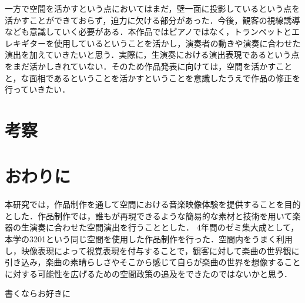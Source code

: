 一方で空間を活かすという点においてはまだ，壁一面に投影しているという点を活かすことができておらず，迫力に欠ける部分があった．今後，観客の視線誘導なども意識していく必要がある．本作品ではピアノではなく，トランペットとエレキギターを使用しているということを活かし，演奏者の動きや演奏に合わせた演出を加えていきたいと思う．実際に，生演奏における演出表現であるという点をまだ活かしきれていない．そのため作品発表に向けては，空間を活かすことと，な面相であるということを活かすということを意識したうえで作品の修正を行っていきたい．


\section{考察}


\section{おわりに}
本研究では，作品制作を通して空間における音楽映像体験を提供することを目的とした．作品制作では，誰もが再現できるような簡易的な素材と技術を用いて楽器の生演奏に合わせた空間演出を行うこととした． 4年間のゼミ集大成として，本学の3201という同じ空間を使用した作品制作を行った．空間内をうまく利用し，映像表現によって視覚表現を付与することで，観客に対して楽曲の世界観に引き込み，楽曲の素晴らしさやそこから感じて自らが楽曲の世界を想像することに対する可能性を広げるための空間政策の追及をできたのではないかと思う．






\begin{acknowledgment}
	書くならお好きに
\end{acknowledgment}

